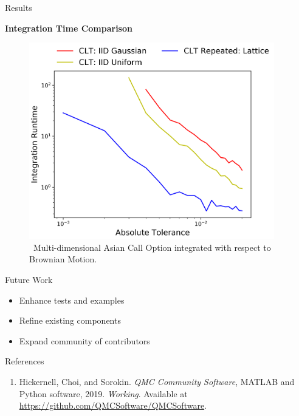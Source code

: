\documentclass[final]{beamer}
\newcommand{\bfCenter}[1]{\centerline{\textbf{#1}}}
\newlength{\sepwid}
\newlength{\onecolwid}
\begin{document}
\begin{frame}[t]
\begin{columns}[t]
\begin{column}{\sepwid}\end{column}
\begin{column}{\onecolwid}\vspace{-.3in}
\begin{block}{Results}
    \bfCenter{Integration Time Comparison}
    \begin{figure}
        \includegraphics[width=1\textwidth]{Images/AbsTol_Runtime_LinePlot.png}
        \caption{\ Multi-dimensional Asian Call Option integrated with respect to  Brownian Motion.}
    \end{figure}
\end{block}

\vspace{-.5in}
\begin{block}{Future Work}
    \begin{itemize}
        \item Enhance tests and examples 
        \item Refine existing components
        \item Expand community of contributors
    \end{itemize}
\end{block}

\begin{block}{References}
\begin{enumerate}
    
    \item Hickernell, Choi, and Sorokin. \textit{QMC Community Software}, MATLAB and Python software, 2019. \textit{Working}. Available at \url{https://github.com/QMCSoftware/QMCSoftware}.
    

\end{enumerate}
\end{block}
\end{column}
\end{columns}
\end{frame}
\end{document}
